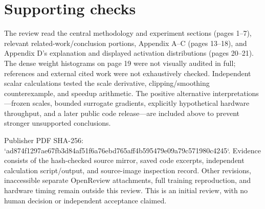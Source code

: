 \documentclass[10pt]{article}
\begin{document}
\section*{Supporting checks}
The review read the central methodology and experiment sections (pages 1–7), relevant related-work/conclusion portions, Appendix A–C (pages 13–18), and Appendix D’s explanation and displayed activation distributions (pages 20–21). The dense weight histograms on page 19 were not visually audited in full; references and external cited work were not exhaustively checked. Independent scalar calculations tested the scale derivative, clipping/smoothing counterexample, and speedup arithmetic. The positive alternative interpretations—frozen scales, bounded surrogate gradients, explicitly hypothetical hardware throughput, and a later public code release—are included above to prevent stronger unsupported conclusions.\par
Publisher PDF SHA-256: `ad874f1297ae67fb3d84af51f6a76ebd765aff4b595479e09a79c571980c4245`. Evidence consists of the hash-checked source mirror, saved code excerpts, independent calculation script/output, and source-image inspection record. Other revisions, inaccessible separate OpenReview attachments, full training reproduction, and hardware timing remain outside this review. This is an initial review, with no human decision or independent acceptance claimed.\par
\end{document}
